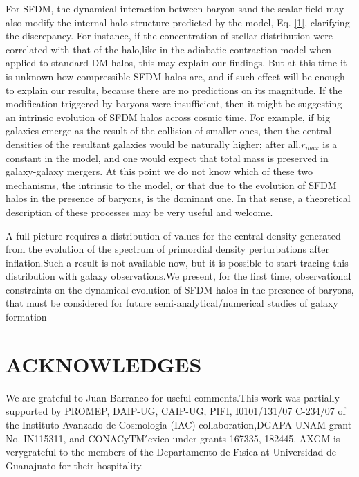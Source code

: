\documentclass[15pt]{IEEEtran}
\begin{document}
\begin{multicols}{2}
    For SFDM, the dynamical interaction between baryon sand  the  scalar  field  may  also  modify  the  internal  halo structure predicted by the model, Eq. \eqref{1}, clarifying the discrepancy.   For  instance,  if  the  concentration  of  stellar  distribution  were  correlated  with  that  of  the  halo,like in the adiabatic contraction model when applied to standard DM halos, this may explain our findings. But at this time it is unknown how compressible SFDM halos are, and if such effect will be enough to explain our results,  because  there  are  no  predictions  on  its  magnitude. If the modification triggered by baryons were insufficient, then it might be suggesting an intrinsic evolution of SFDM halos across cosmic time.  For example, if big galaxies  emerge  as  the  result  of  the  collision  of  smaller ones, then the central densities of the resultant galaxies would be naturally higher;  after all,\(r_{max}\) is a constant in  the  model,  and  one  would  expect  that  total  mass  is preserved in galaxy-galaxy mergers.  At this point we do not know which of these two mechanisms, the intrinsic to the model, or that due to the evolution of SFDM halos in the presence of baryons, is the dominant one.  In that sense, a theoretical description of these processes may be very useful and welcome.
    \par
    A full picture requires a distribution of values for the central density generated from the evolution of the spectrum of primordial density perturbations after inflation.Such a result is not available now,  but it is possible to start tracing this distribution with galaxy observations.We present, for the first time, observational constraints on the dynamical evolution of SFDM halos in the presence of baryons, that must be considered for future semi-analytical/numerical studies of galaxy formation
      \section{\textbf{ACKNOWLEDGES}}
      We are grateful to Juan Barranco for useful comments.This work was partially supported by PROMEP, DAIP-UG, CAIP-UG, PIFI, I0101/131/07 C-234/07 of the Instituto  Avanzado  de  Cosmologia  (IAC)  collaboration,DGAPA-UNAM  grant  No.   IN115311,  and  CONACyTM ́exico  under  grants  167335,  182445.   AXGM  is  verygrateful to the members of the Departamento de F́ısica at Universidad de Guanajuato for their hospitality.
      





\end{multicols}
\end{document}
